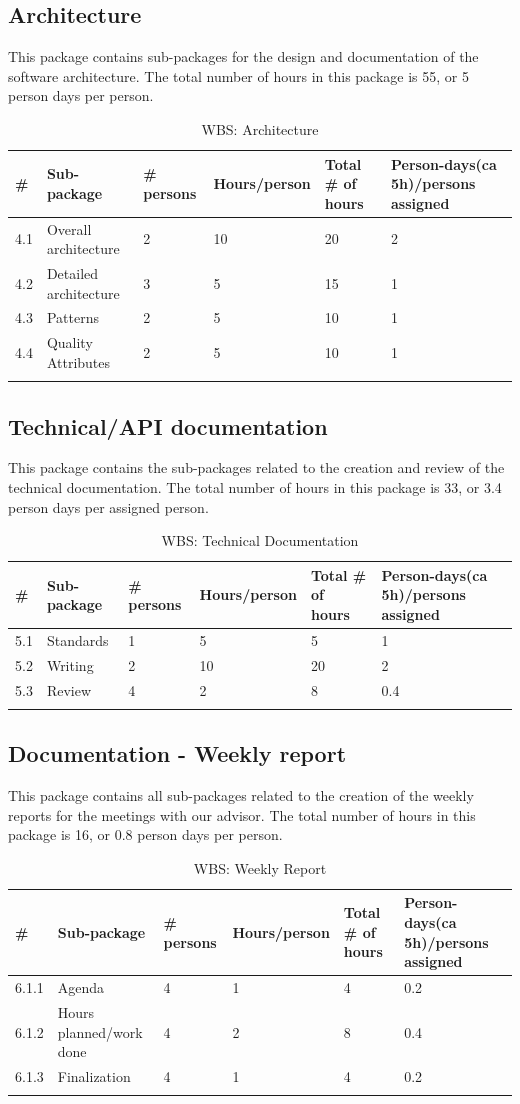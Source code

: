 \subsection{Architecture}
This package contains sub-packages for the design and documentation of the software architecture. The total number of hours in this package is 55, or 5 person days per person.
\begin{longtable}{|p{0.7cm}|p{3cm}|p{1.8cm}|p{2.5cm}|p{2cm}|p{2.8cm}|}
\hline
\# & Sub-package & \# persons & Hours/person & Total \# of hours & Person-days(ca 5h)/persons assigned\\ 
\hline
4.1 & Overall architecture & 2 & 10 & 20 & 2\\ 
\hline
4.2 & Detailed architecture & 3 & 5 & 15 & 1\\ 
\hline
4.3 & Patterns & 2 & 5 & 10 & 1\\ 
\hline
4.4 & Quality Attributes & 2 & 5 & 10 & 1\\ 
\hline
\caption{WBS: Architecture}
\end{longtable}

\subsection{Technical/API documentation}
This package contains the sub-packages related to the creation and review of the technical documentation. The total number of hours in this package is 33, or 3.4 person days per assigned person.
\begin{longtable}{|p{0.7cm}|p{3cm}|p{1.8cm}|p{2.5cm}|p{2cm}|p{2.8cm}|}
\hline
\# & Sub-package & \# persons & Hours/person & Total \# of hours & Person-days(ca 5h)/persons assigned\\ 
\hline
5.1 & Standards & 1 & 5 & 5 & 1\\ 
\hline
5.2 & Writing & 2 & 10 & 20 & 2\\ 
\hline
5.3 & Review & 4 & 2 & 8 & 0.4\\ 
\hline
\caption{WBS: Technical Documentation}
\end{longtable}

\subsection{Documentation - Weekly report}
This package contains all sub-packages related to the creation of the weekly reports for the meetings with our advisor. The total number of hours in this package is 16, or 0.8 person days per person.
\begin{longtable}{|p{0.7cm}|p{3cm}|p{1.8cm}|p{2.5cm}|p{2cm}|p{2.8cm}|}
\hline
\# & Sub-package & \# persons & Hours/person & Total \# of hours & Person-days(ca 5h)/persons assigned\\ 
\hline
6.1.1 & Agenda & 4 & 1 & 4 & 0.2\\ 
\hline
6.1.2 & Hours planned/work done & 4 & 2 & 8 & 0.4\\ 
\hline
6.1.3 & Finalization & 4 & 1 & 4 & 0.2\\ 
\hline
\caption{WBS: Weekly Report}
\end{longtable}


